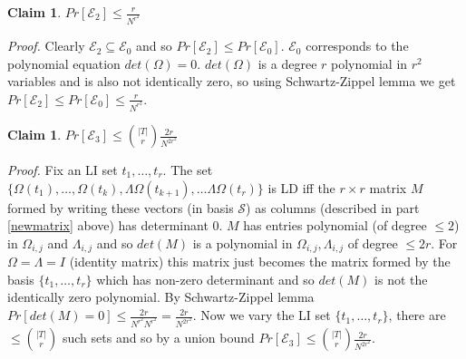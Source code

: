 \documentclass[letterpaper,USenglish,numberwithinsect]{lipics}
\newcommand{\ME}{\mathcal{E}}
\newcommand{\MS}{\mathcal{S}}
\newtheorem{claim}[theorem]{Claim}
\begin{document}
\begin{claim}
 $Pr[\ME_2]\leq \frac{r}{N^{r^2}}$
\end{claim}
\emph{Proof.}
  Clearly $\ME_2 \subseteq \ME_0$ and so
 $Pr[\ME_2]\leq Pr[\ME_0]$. $\ME_0$ corresponds to the polynomial equation $det(\Omega)=0$. $det(\Omega)$ is
 a degree $r$ polynomial in $r^2$ variables and is also not identically zero, so using Schwartz-Zippel lemma we get
 $Pr[\ME_2]\leq Pr[ \ME_0] \leq \frac{r}{N^{r^2}}$.


\begin{claim}
 $Pr[\ME_3]\leq {|T|\choose r}\frac{2r}{N^{2r^2}}$
\end{claim}
\emph{Proof.}
 Fix an LI set $t_1,\ldots,t_r$. The set $\{\Omega(t_1),\ldots,\Omega(t_k), \Lambda\Omega(t_{k+1}),\ldots \Lambda\Omega(t_r)\}$
 is LD iff the $r\times r$ matrix $M$ formed by writing these vectors (in basis $\MS$) as columns (described in part \ref{newmatrix} above)
 has determinant $0$.
 $M$ has entries polynomial (of degree $\leq 2$) in $\Omega_{i,j}$ and $\Lambda_{i,j}$ and so $det(M)$ is a polynomial in
 $\Omega_{i,j},\Lambda_{i,j}$ of degree $\leq 2r$.
 For $\Omega=\Lambda = I$ (identity matrix) this matrix just becomes the matrix formed by the basis $\{t_1,\ldots,t_r\}$ which has
 non-zero determinant and so $det(M)$ is not the identically zero polynomial.  By Schwartz-Zippel lemma $Pr[det(M)=0]\leq \frac{2r}{N^{r^2}N^{r^2}} =
 \frac{2r}{N^{2r^2}}$. Now we vary the LI set $\{t_1,\ldots,t_r\}$, there are $\leq {|T|\choose r}$ such sets and so by a union bound
 $Pr[\ME_3]\leq {|T|\choose r} \frac{2r}{N^{2r^2}}$.
\end{document}
